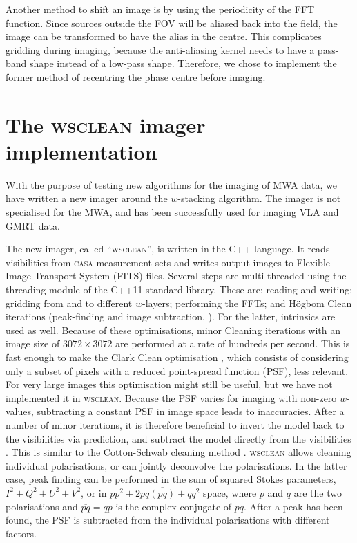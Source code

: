 \documentclass[useAMS,usenatbib]{mn2e}
\begin{document}
Another method to shift an image is by using the periodicity of the FFT function. Since sources outside the FOV will be aliased back into the field, the image can be transformed to have the alias in the centre. This complicates gridding during imaging, because the anti-aliasing kernel needs to have a pass-band shape instead of a low-pass shape. Therefore, we chose to implement the former method of recentring the phase centre before imaging.

\section{The \textsc{wsclean} imager implementation} \label{sec:implementation}
With the purpose of testing new algorithms for the imaging of MWA data, we have written a new imager around the $w$-stacking algorithm. The imager is not specialised for the MWA, and has been successfully used for imaging VLA and GMRT data.

The new imager, called ``\textsc{wsclean}'', is written in the C++ language. It reads visibilities from \textsc{casa} measurement sets and writes output images to Flexible Image Transport System (FITS) files. Several steps are multi-threaded using the threading module of the C++11 standard library. These are: reading and writing; gridding from and to different $w$-layers; performing the FFTs; and H\"ogbom Clean iterations (peak-finding and image subtraction, \citealt{hogbom-clean}). For the latter, intrinsics are used as well. Because of these optimisations, minor Cleaning iterations with an image size of $3072\times3072$ are performed at a rate of hundreds per second. This is fast enough to make the Clark Clean optimisation \citep{clark-clean}, which consists of considering only a subset of pixels with a reduced point-spread function (PSF), less relevant. For very large images this optimisation might still be useful, but we have not implemented it in \textsc{wsclean}. Because the PSF varies for imaging with non-zero $w$-values, subtracting a constant PSF in image space leads to inaccuracies. After a number of minor iterations, it is therefore beneficial to invert the model back to the visibilities via prediction, and subtract the model directly from the visibilities \citep{wprojection-cornwell}. This is similar to the Cotton-Schwab cleaning method \citep{cotton-schwab-clean}. \textsc{wsclean} allows cleaning individual polarisations, or can jointly deconvolve the polarisations. In the latter case, peak finding can be performed in the sum of squared Stokes parameters, $I^2+Q^2+U^2+V^2$, or in $pp^2+2pq \overline{(pq)} + qq^2$ space, where $p$ and $q$ are the two polarisations and $\overline{pq}=qp$ is the complex conjugate of $pq$. After a peak has been found, the PSF is subtracted from the individual polarisations with different factors.
\end{document}
